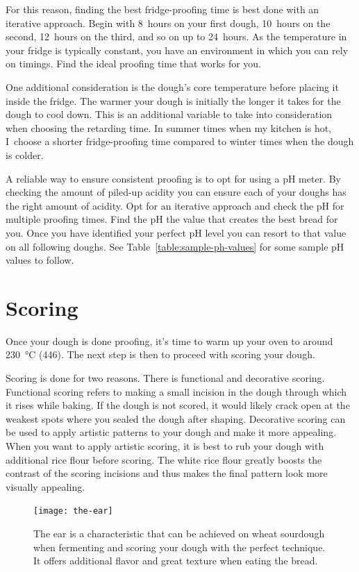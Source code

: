 For this reason, finding the best fridge-proofing time is best done
with an iterative approach. Begin with 8~hours on your first dough,
10~hours on the second, 12~hours on the third, and so on up to 24~hours.
As the temperature in your fridge is typically constant, you have an
environment in which you can rely on timings. Find the ideal proofing
time that works for you.

One additional consideration is the dough's core temperature before
placing it inside the fridge. The warmer your dough is initially
the longer it takes for the dough to cool down. This is an additional
variable to take into consideration when choosing the retarding time.
In summer times when my kitchen is hot, I~choose a shorter fridge-proofing
time compared to winter times when the dough is colder.

A reliable way to ensure consistent proofing is to opt for using a pH
meter. By checking the amount of piled-up acidity you can ensure
each of your doughs has the right amount of acidity. Opt for an iterative
approach and check the pH for multiple proofing times. Find the pH
the value that creates the best bread for you. Once you have identified
your perfect pH level you can resort to that value on all following
doughs. See Table~\ref{table:sample-ph-values} for some sample pH values
to follow.

\section{Scoring}

Once your dough is done proofing, it's time to warm up your oven
to around \qty{230}{\degreeCelsius} (\qty{446}{\degF}). The next step is then
to proceed with scoring your dough.

Scoring is done for two reasons. There is functional and decorative
scoring. Functional scoring refers to making a small incision in the dough
through which it rises while baking. If the dough is not scored,
it would likely crack open at the weakest spots where you sealed
the dough after shaping. Decorative scoring can be used to apply
artistic patterns to your dough and make it more appealing. When
you want to apply artistic scoring, it is best to rub your dough
with additional rice flour before scoring. The white rice flour
greatly boosts the contrast of the scoring incisions and thus
makes the final pattern look more visually appealing.

\begin{figure}[htb!]
  \texttt{[image: the-ear]}
  \caption[Bread's ear]{The ear is a characteristic that can be achieved on
      wheat sourdough when fermenting and scoring your dough with the perfect
      technique. It offers additional flavor and great texture when eating the
      bread.}%
  \label{fig:the-ear}
\end{figure}

